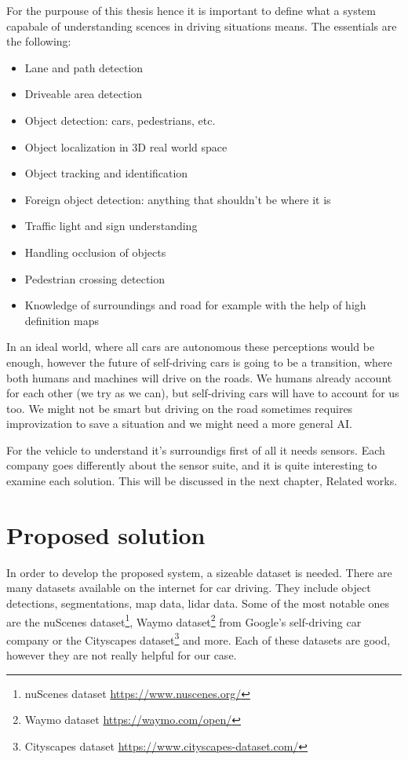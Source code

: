 For the purpouse of this thesis hence it is important to define what a system
capabale of understanding scences in driving situations means. The essentials
are the following:
\begin{itemize}
    \item Lane  and path detection
    \item Driveable area detection
    \item Object detection: cars, pedestrians, etc.
    \item Object localization in 3D real world space
    \item Object tracking and identification
    \item Foreign object detection: anything that shouldn't be where it is
    \item Traffic light and sign understanding
    \item Handling occlusion of objects
    \item Pedestrian crossing detection
    \item Knowledge of surroundings and road for example with the help of high
          definition maps
\end{itemize}

In an ideal world, where all cars are autonomous these perceptions would be
enough, however the future of self-driving cars is going to be a transition,
where both humans and machines will drive on the roads. We humans already
account for each other (we try as we can), but self-driving cars will have to
account for us too. We might not be smart but driving on the road sometimes
requires improvization to save a situation and we might need a more general AI.

For the vehicle to understand it's surroundigs first of all it needs sensors.
Each company goes differently about the sensor suite, and it is quite
interesting to examine each solution. This will be discussed in the next
chapter, Related works.

\section{Proposed solution}

In order to develop the proposed system, a sizeable dataset is needed. There are
many datasets available on the internet for car driving. They include object
detections, segmentations, map data, lidar data. Some of the most notable ones
are the nuScenes dataset\footnote{nuScenes dataset
\url{https://www.nuscenes.org/}}, Waymo dataset\footnote{Waymo dataset
\url{https://waymo.com/open/}} from Google's self-driving car company or the
Cityscapes dataset\footnote{Cityscapes dataset
\url{https://www.cityscapes-dataset.com/}} and more. Each of these datasets are
good, however they are not really helpful for our case.

